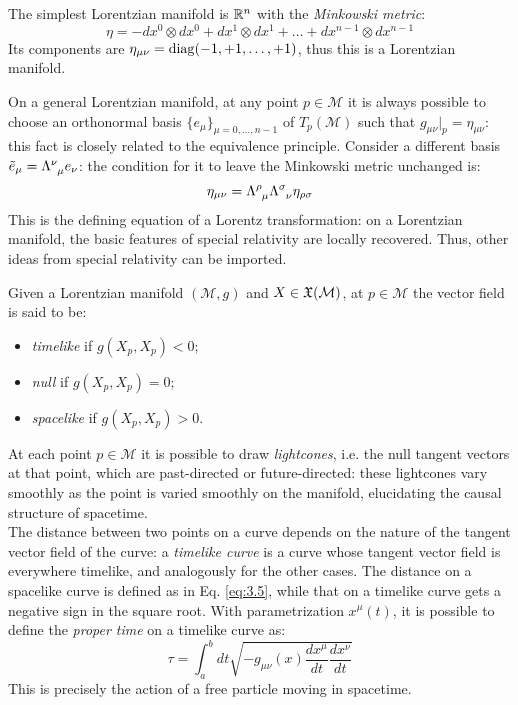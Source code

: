 \begin{example}
  The simplest Lorentzian manifold is $ \mathbb{R}^n $ with the \textit{Minkowski metric}:
  \begin{equation}
    \eta = - dx^0 \otimes dx^0 + dx^1 \otimes dx^1 + \dots + dx^{n-1} \otimes dx^{n-1}
    \label{eq:3.7}
  \end{equation}
  Its components are $ \eta_{\mu \nu} = \operatorname{diag} (-1,+1,\dots,+1) $, thus this is a Lorentzian manifold.
\end{example}

On a general Lorentzian manifold, at any point $ p \in \mathcal{M} $ it is always possible to choose an orthonormal basis $ \{e_{\mu}\}_{\mu = 0,\dots,n-1} $ of $ T_p (\mathcal{M}) $ such that $ g_{\mu \nu} \vert_p = \eta_{\mu \nu} $: this fact is closely related to the equivalence principle. Consider a different basis $ \tilde{e}_{\mu} = \tensor{\Lambda}{^\nu _\mu} e_{\nu} $: the condition for it to leave the Minkowski metric unchanged is:
\begin{equation}
  \eta_{\mu \nu} = \tensor{\Lambda}{^\rho _\mu} \tensor{\Lambda}{^\sigma _\nu} \eta_{\rho \sigma}
  \label{eq:3.8}
\end{equation}
This is the defining equation of a Lorentz transformation: on a Lorentzian manifold, the basic features of special relativity are locally recovered. Thus, other ideas from special relativity can be imported.

\begin{definition}
  Given a Lorentzian manifold $ (\mathcal{M},g) $ and $ X \in \mathfrak{X}(\mathcal{M}) $, at $ p \in \mathcal{M} $ the vector field is said to be:
  \begin{itemize}
    \item \textit{timelike} if $ g(X_p,X_p) < 0 $;
    \item \textit{null} if $ g(X_p,X_p) = 0 $;
    \item \textit{spacelike} if $ g(X_p,X_p) > 0 $.
  \end{itemize}
\end{definition}

At each point $ p \in \mathcal{M} $ it is possible to draw \textit{lightcones}, i.e. the null tangent vectors at that point, which are past-directed or future-directed: these lightcones vary smoothly as the point is varied smoothly on the manifold, elucidating the causal structure of spacetime.\\
The distance between two points on a curve depends on the nature of the tangent vector field of the curve: a \textit{timelike curve} is a curve whose tangent vector field is everywhere timelike, and analogously for the other cases. The distance on a spacelike curve is defined as in Eq. \ref{eq:3.5}, while that on a timelike curve gets a negative sign in the square root. With parametrization $ x^{\mu}(t) $, it is possible to define the \textit{proper time} on a timelike curve as:
\begin{equation}
  \tau = \int_a^b dt \sqrt{- g_{\mu \nu}(x) \frac{dx^{\mu}}{dt} \frac{dx^{\nu}}{dt}}
  \label{eq:3.9}
\end{equation}
This is precisely the action of a free particle moving in spacetime.


